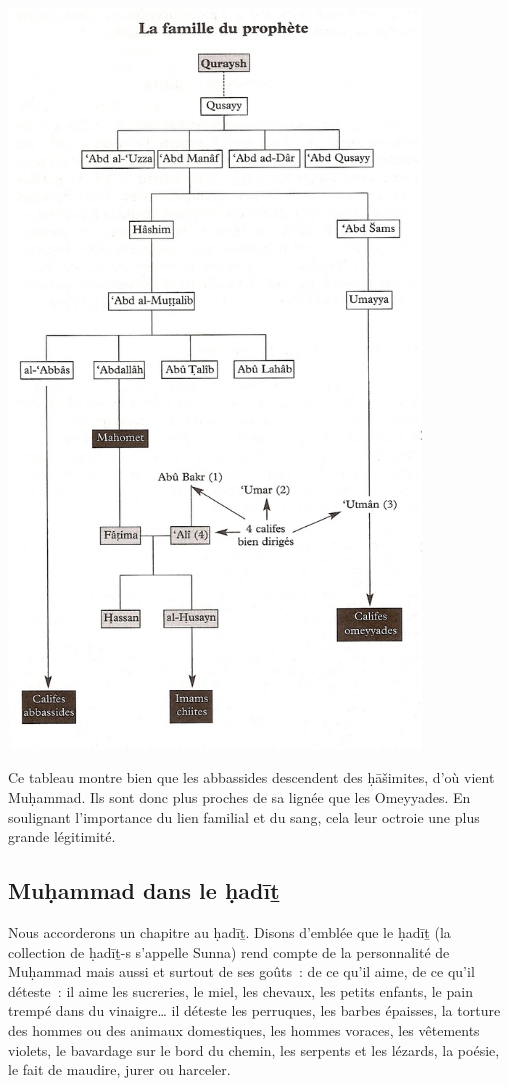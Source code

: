 \includegraphics[width=4.31134in,height=7.72685in]{Images/image039.png}

Ce tableau montre bien que les abbassides descendent des ḥāšimites, d'où
vient Muḥammad. Ils sont donc plus proches de sa lignée que les
Omeyyades. En soulignant l'importance du lien familial et du sang, cela
leur octroie une plus grande légitimité.

 
\subsection{Muḥammad dans le ḥadīṯ
 }

Nous accorderons un chapitre au {ḥadīṯ}. Disons d'emblée que le
ḥadīṯ (la collection de ḥadīṯ-s s'appelle {Sunna}) rend compte de
la personnalité de Muḥammad mais aussi et surtout de ses goûts~: de ce
qu'il aime, de ce qu'il déteste~: il aime les sucreries, le miel, les
chevaux, les petits enfants, le pain trempé dans du vinaigre\ldots{} il
déteste les perruques, les barbes épaisses, la torture des hommes ou des
animaux domestiques, les hommes voraces, les vêtements violets, le
bavardage sur le bord du chemin, les serpents et les lézards, la poésie,
le fait de maudire, jurer ou harceler.

